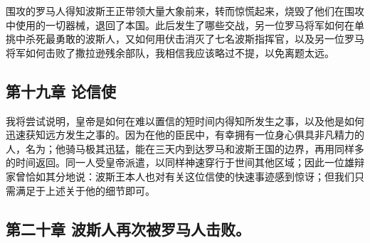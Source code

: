 围攻的罗马人得知波斯王正带领大量大象前来，转而惊慌起来，烧毁了他们在围攻中使用的一切器械，退回了本国。此后发生了哪些交战，另一位罗马将军如何在单挑中杀死最勇敢的波斯人，又如何用伏击消灭了七名波斯指挥官，以及另一位罗马将军如何击败了撒拉逊残余部队，我相信我应该略过不提，以免离题太远。\par


\subsection{第十九章 论信使}

我将尝试说明，皇帝是如何在难以置信的短时间内得知所发生之事，以及他是如何迅速获知远方发生之事的。因为在他的臣民中，有幸拥有一位身心俱具非凡精力的人，名为；他骑马极其迅猛，能在三天内到达罗马和波斯王国的边界，再用同样多的时间返回。同一人受皇帝派遣，以同样神速穿行于世间其他区域；因此一位雄辩家曾恰如其分地说：波斯王本人也对有关这位信使的快速事迹感到惊讶；但我们只需满足于上述关于他的细节即可。\par


\subsection{第二十章 波斯人再次被罗马人击败。}

